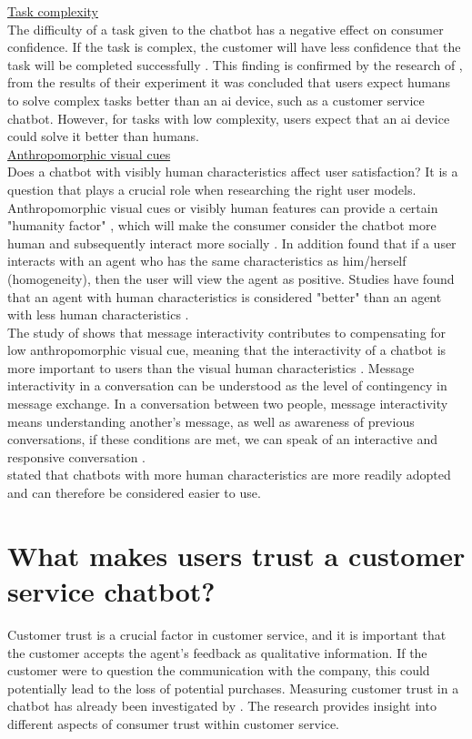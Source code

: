 \break
\ul{Task complexity}\\
The difficulty of a task given to the chatbot has a negative effect on consumer confidence. If the task is complex, the customer will have less confidence that the task will be completed successfully \citep{Cheng2021}.
This finding is confirmed by the research of \citeauthor{XU2020}, from the results of their experiment it was concluded that users expect humans to solve complex tasks better than an \acrshort{ai} device, such as a customer service chatbot. However, for tasks with low complexity, users expect that an \acrshort{ai} device could solve it better than humans. \citep{XU2020}\\
\break
\ul{Anthropomorphic visual cues}\\
Does a chatbot with visibly human characteristics affect user satisfaction? It is a question that plays a crucial role when researching the right user models. Anthropomorphic visual cues or visibly human features can provide a certain "humanity factor" \citep{Shyam2008}, which will make the consumer consider the chatbot more human and subsequently interact more socially \citep*{Go2019,Gong2007,Kim2012, Nowak2004}.
In addition \citeauthor{Go2019,Koda1996,Wexelblat1998} found that if a user interacts with an agent who has the same characteristics as him/herself (homogeneity), then the user will view the agent as positive. Studies have found that an agent with human characteristics is considered "better" than an agent with less human characteristics \citep*{Go2019,Koda1996,Wexelblat1998}.  
\\
\break
The study of \citeauthor{Go2019} shows that message interactivity contributes to compensating for low anthropomorphic visual cue, meaning that the interactivity of a chatbot is more important to users than the visual human characteristics \citep{Go2019}. Message interactivity in a conversation can be understood as the level of contingency in message exchange. In a conversation between two people, message interactivity means understanding another's message, as well as awareness of previous conversations, if these conditions are met, we can speak of an interactive and responsive conversation \citep*{Go2019,Sudweeks1998}.\\
\break
\citeauthor{Sheehan2020} stated that chatbots with more human characteristics are more readily adopted and can therefore be considered easier to use. \citep{Sheehan2020}
\section{What makes users trust a customer service chatbot?}
Customer trust is a crucial factor in customer service, and it is important that the customer accepts the agent's feedback as qualitative information. If the customer were to question the communication with the company, this could potentially lead to the loss of potential purchases. Measuring customer trust in a chatbot has already been investigated by \citeauthor{Folstad2018}. The research provides insight into different aspects of consumer trust within customer service.
